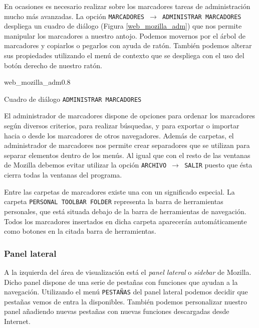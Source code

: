 En  ocasiones  es  necesario  realizar  sobre  los  marcadores  tareas
de  administración  mucho más  avanzadas.  La  opción {\tt  MARCADORES
$\rightarrow$ ADMINISTRAR  MARCADORES} despliega un cuadro  de diálogo
(Figura   \ref{web_mozilla_adm})  que   nos   permite  manipular   los
marcadores  a  nuestro  antojo.  Podemos  movernos  por  el  árbol  de
marcadores y copiarlos o pegarlos  con ayuda de ratón. También podemos
alterar  sus  propiedades  utilizando  el  menú  de  contexto  que  se
despliega con el uso del botón derecho de nuestro ratón.

\begin{figura}{web_mozilla_adm}{0.8}
\caption{Cuadro de diálogo {\tt ADMINISTRAR MARCADORES}}
\label{web_mozilla_adm}
\end{figura}

El administrador  de marcadores dispone  de opciones para  ordenar los
marcadores según  diversos criterios, para realizar  búsquedas, y para
exportar o importar hacia o desde los marcadores de otros navegadores.
Además de carpetas,  el administrador de marcadores  nos permite crear
separadores  que se  utilizan  para separar  elementos  dentro de  los
menús. Al  igual que  con el  resto de las  ventanas de  {\sf Mozilla}
debemos evitar  utilizar la  opción {\tt ARCHIVO  $\rightarrow$ SALIR}
puesto que ésta cierra todas la ventanas del programa.

Entre  las  carpetas  de  marcadores existe  una  con  un  significado
especial. La carpeta {\tt PERSONAL TOOLBAR FOLDER} representa la barra
de herramientas  personales, que  está situada debajo  de la  barra de
herramientas de  navegación. Todos los marcadores  insertados en dicha
carpeta aparecerán automáticamente como botones  en la citada barra de
herramientas.

\subsubsection{Panel lateral}

A la izquierda del área de visualización está el {\em panel lateral} o
{\em sidebar}  de {\sf Mozilla}. Dicho  panel dispone de una  serie de
pestañas con funciones que ayudan  a la navegación. Utilizando el menú
{\tt PESTAÑAS} del panel lateral podemos decidir que pestañas vemos de
entra  la  disponibles.  También podemos  personalizar  nuestro  panel
añadiendo  nuevas  pestañas  con nuevas  funciones  descargadas  desde
Internet.

